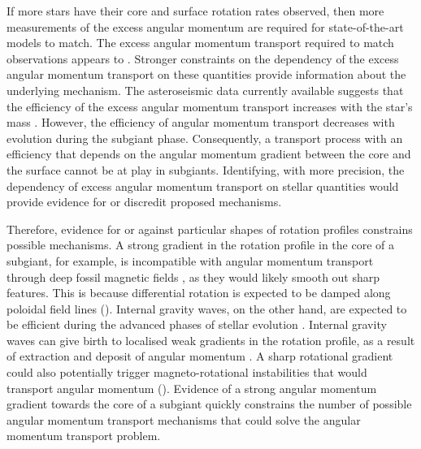 If more stars have their core and surface rotation rates observed, then more measurements of the excess angular momentum are required for state-of-the-art models to match.
The excess angular momentum transport required to match observations appears to .
Stronger constraints on the dependency of the excess angular momentum transport on these quantities provide information about the underlying mechanism.
The \kepler{} asteroseismic data currently available suggests that the efficiency of the excess angular momentum transport increases with the star's mass \citep{eggenberger_asteroseismology_2019}.
However, the efficiency of angular momentum transport decreases with evolution during the subgiant phase.
Consequently, a transport process with an efficiency that depends on the angular momentum gradient between the core and the surface cannot be at play in subgiants.
Identifying, with more precision, the dependency of excess angular momentum transport on stellar quantities would provide evidence for or discredit proposed mechanisms.

Therefore, evidence for or against particular shapes of rotation profiles constrains possible mechanisms.
A strong gradient in the rotation profile in the core of a subgiant, for example, is incompatible with angular momentum transport through deep fossil magnetic fields \citep{gough_effect_1990}, as they would likely smooth out sharp features.
 This is because differential rotation is expected to be damped along poloidal field lines (\citealp{garaud_rotationally_2002, strugarek_magnetic_2011}).
 Internal gravity waves, on the other hand, are expected to be efficient during the advanced phases of stellar evolution \citep{charbonnel_deep_2008}. 
Internal gravity waves can give birth to localised weak gradients in the rotation profile, as a result of extraction and deposit of angular momentum \citep{charbonnel_influence_2005}. 
A sharp rotational gradient could also potentially trigger magneto-rotational instabilities that would transport angular momentum (\citealp{balbus_stability_1994,arlt_differential_2003,menou_magnetorotational_2006, fuller_asteroseismology_2015, fuller_slowing_2019,moyano_asteroseismology_2022}). 
Evidence of a strong angular momentum gradient towards the core of a subgiant quickly constrains the number of possible angular momentum transport mechanisms that could solve the angular momentum transport problem.

